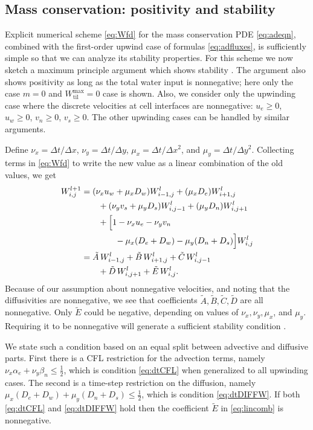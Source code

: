 \documentclass[gmd]{copernicus}   %
\newcommand{\text}{\textrm}
\newcommand{\Wtilmax}{W_{\text{til}}^{\text{max}}}
\newcommand{\Wlij}{W^l_{i,j}}
\begin{document}
\subsection{Mass conservation: positivity and stability}  Explicit numerical scheme \eqref{eq:Wfd} for the mass conservation PDE \eqref{eq:adeqn}, combined with the first-order upwind case of formulas \eqref{eq:adfluxes}, is sufficiently simple so that we can analyze its stability properties.  For this scheme we now sketch a maximum principle argument which shows stability \citep{MortonMayers}.  The argument also shows positivity \citep{HundsdorferVerwer2010} as long as the total water input is nonnegative; here only the case $m = 0$ and $\Wtilmax=0$ case is shown.  Also, we consider only the upwinding case where the discrete velocities at cell interfaces are nonnegative: $u_e\ge 0$, $u_w\ge 0$, $v_n\ge 0$, $v_s\ge 0$.  The other upwinding cases can be handled by similar arguments.

Define $\nu_x = \Delta t/\Delta x$, $\nu_y = \Delta t/\Delta y$, $\mu_x = \Delta t/\Delta x^2$, and $\mu_y = \Delta t/\Delta y^2$.  Collecting terms in \eqref{eq:Wfd} to write the new value as a linear combination of the old values, we get
\begin{align}
 W_{i,j}^{l+1} &= (\nu_x u_w + \mu_x D_w) W_{i-1,j}^l + (\mu_x D_e) W_{i+1,j}^l \notag \\
      &\qquad + (\nu_y v_s + \mu_y D_s) W_{i,j-1}^l + (\mu_y D_n) W_{i,j+1}^l  \notag \\
      &\qquad + \Big[1 - \nu_x u_e - \nu_y v_n \notag \\
      &\qquad\qquad - \mu_x (D_e + D_w) - \mu_y (D_n + D_s)\Big] \Wlij \notag \\
  &= \tilde A\, W_{i-1,j}^l + \tilde B\, W_{i+1,j}^l + \tilde C\, W_{i,j-1}^l \notag \\
  &\qquad + \tilde D\, W_{i,j+1}^l + \tilde E\, \Wlij. \label{eq:lincomb}
\end{align}
Because of our assumption about nonnegative velocities, and noting that the diffusivities are nonnegative, we see that coefficients $\tilde A,\tilde B,\tilde C,\tilde D$ are all nonnegative.  Only $\tilde E$ could be negative, depending on values of $\nu_x, \nu_y, \mu_x$, and $\mu_y$.  Requiring it to be nonnegative will generate a sufficient stability condition \citep{MortonMayers}.

We state such a condition based on an equal split between advective and diffusive parts.  First there is a CFL restriction for the advection terms, namely $\nu_x \alpha_e + \nu_y \beta_n \le \frac{1}{2}$, which is condition \eqref{eq:dtCFL} when generalized to all upwinding cases.  The second is a time-step restriction on the diffusion, namely $\mu_x (D_e + D_w) + \mu_y (D_n + D_s) \le \frac{1}{2}$, which is condition \eqref{eq:dtDIFFW}.  If both \eqref{eq:dtCFL} and \eqref{eq:dtDIFFW} hold then the coefficient $\tilde E$ in \eqref{eq:lincomb} is nonnegative.
\end{document}
